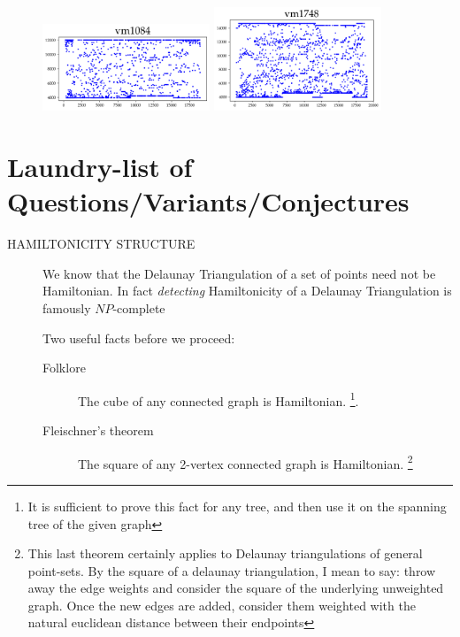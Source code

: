 \begin{appendices}
\begin{figure}[H]
\includegraphics[width=5cm]{../tsplib_euc2d_pictures_of_instances/vm1084.png}
\includegraphics[width=5cm]{../tsplib_euc2d_pictures_of_instances/vm1748.png}
 \end{figure}


\newpage
\section{Laundry-list of Questions/Variants/Conjectures}
 \label{sec:questions}


\begin{description}
\item[\color{red} HAMILTONICITY STRUCTURE] We know that the Delaunay Triangulation of a set of points need not be Hamiltonian. In fact \textit{detecting}
      Hamiltonicity of a Delaunay Triangulation is famously $NP$-complete \cite{dillencourt1996finding} 

      Two useful facts before we proceed: 

     \begin{description}
       \item[Folklore] The cube of any connected graph is Hamiltonian. 
             \footnote{It is sufficient to prove this fact for any tree, and then use it on the spanning tree of the given graph}. 
       \item[Fleischner's theorem  \cite{georgakopoulos2009short}] The square of 
             any 2-vertex connected graph is Hamiltonian. 
          \footnote{This last theorem certainly applies to Delaunay triangulations of general point-sets. By the square of a delaunay triangulation, I mean to say: throw away the edge weights and consider the square of the underlying unweighted graph. Once the new edges are added, consider them weighted with the natural euclidean distance between their endpoints}
     \end{description}


\end{description}
\end{appendices}
